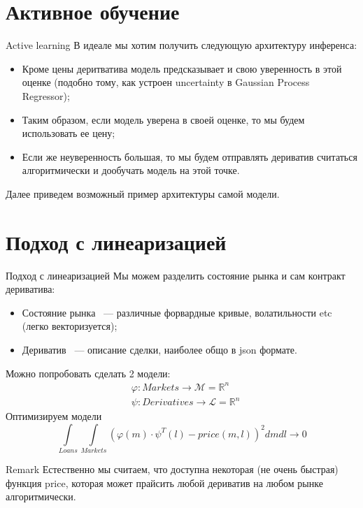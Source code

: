 \documentclass[10pt]{beamer}
\newcommand{\R}{\ensuremath{\mathbb{R}}}
\renewcommand{\phi}{\varphi}
\begin{document}
    \section{Активное обучение}
    \begin{frame}{Active learning}
        В идеале мы хотим получить следующую архитектуру инференса:
        \begin{itemize}
            \item Кроме цены деритватива модель предсказывает и свою уверенность в этой оценке (подобно тому, как устроен uncertainty в Gaussian Process Regressor);
            \item Таким образом, если модель уверена в своей оценке, то мы будем использовать ее цену;
            \item Если же неуверенность большая, то мы будем отправлять дериватив считаться алгоритмически и дообучать модель на этой точке.
        \end{itemize}
        Далее приведем возможный пример архитектуры самой модели.
    \end{frame}

    \section{Подход с линеаризацией}
    \begin{frame}{Подход с линеаризацией}
        Мы можем разделить состояние рынка и сам контракт дериватива:
        \begin{itemize}
            \item Состояние рынка ~--- различные форвардные кривые, волатильности etc (легко векторизуется);
            \item Дериватив ~--- описание сделки, наиболее общо в json формате.
        \end{itemize}

        Можно попробовать сделать 2 модели:
        \begin{align*}
            & \phi: Markets \to \mathcal{M} = \R^n \\
            & \psi: Derivatives \to \mathcal{L} = \R^n
        \end{align*}
        Оптимизируем модели 
        \[
            \int\limits_{Loans}\int\limits_{Markets}\left( \phi(m) \cdot \psi^T(l) - price(m, l) \right)^2 dm dl \to 0
        \]

        \begin{block}{Remark}
            Естественно мы считаем, что доступна некоторая (не очень быстрая) функция price, которая может прайсить любой дериватив на любом рынке алгоритмически.
        \end{block}
    \end{frame}
\end{document}
